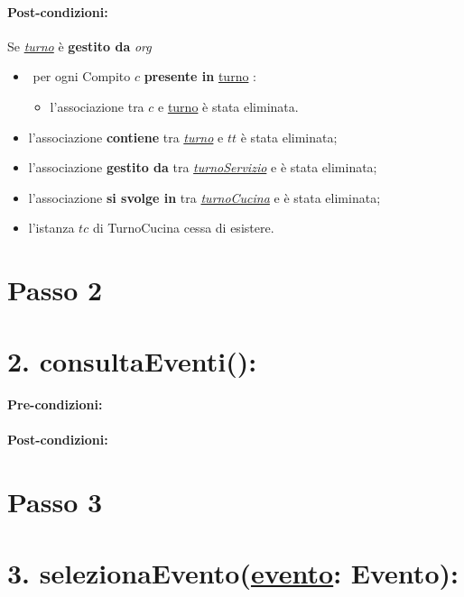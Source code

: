 {\paragraph{Post-condizioni:} Se \underline{\textit{turno}} è \textbf{gestito da} {\textit{org}}

\begin{itemize}
   \item \textlangle $ $ per ogni Compito $c$ \textbf{presente in} \underline{turno} \textrangle:
    \begin{itemize}
        \item l'associazione tra $c$ e \underline{turno} è stata eliminata.
    \end{itemize}
    \item l'associazione \textbf{contiene} tra \underline{\textit{turno}} e $tt$ è stata eliminata;
    \item l'associazione \textbf{gestito da} tra \underline{\textit{turnoServizio}} e  è stata eliminata;
\item l'associazione \textbf{si svolge in} tra \underline{\textit{turnoCucina}} e  è stata eliminata;
    \item l'istanza $tc$ di TurnoCucina cessa di esistere.
\end{itemize}

\section{Passo 2}
\section*{2. consultaEventi():}

\paragraph{Pre-condizioni:}

\paragraph{Post-condizioni:}


\section{Passo 3}
\section*{3. selezionaEvento(\underline{evento}: Evento):}

}
